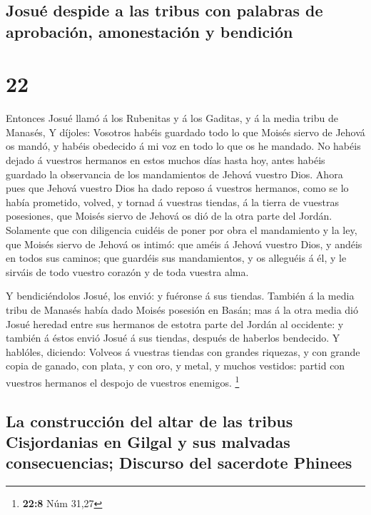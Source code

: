\hypertarget{josuuxe9-despide-a-las-tribus-con-palabras-de-aprobaciuxf3n-amonestaciuxf3n-y-bendiciuxf3n}{%
\subsection{Josué despide a las tribus con palabras de aprobación,
amonestación y
bendición}\label{josuuxe9-despide-a-las-tribus-con-palabras-de-aprobaciuxf3n-amonestaciuxf3n-y-bendiciuxf3n}}

\hypertarget{section-21}{%
\section{22}\label{section-21}}

 Entonces Josué llamó á los Rubenitas y á los Gaditas, y á
la media tribu de Manasés,  Y díjoles: Vosotros habéis
guardado todo lo que Moisés siervo de Jehová os mandó, y habéis
obedecido á mi voz en todo lo que os he mandado.  No habéis
dejado á vuestros hermanos en estos muchos días hasta hoy, antes habéis
guardado la observancia de los mandamientos de Jehová vuestro Dios.
 Ahora pues que Jehová vuestro Dios ha dado reposo á
vuestros hermanos, como se lo había prometido, volved, y tornad á
vuestras tiendas, á la tierra de vuestras posesiones, que Moisés siervo
de Jehová os dió de la otra parte del Jordán.  Solamente que
con diligencia cuidéis de poner por obra el mandamiento y la ley, que
Moisés siervo de Jehová os intimó: que améis á Jehová vuestro Dios, y
andéis en todos sus caminos; que guardéis sus mandamientos, y os
alleguéis á él, y le sirváis de todo vuestro corazón y de toda vuestra
alma.

 Y bendiciéndolos Josué, los envió: y fuéronse á sus
tiendas.  También á la media tribu de Manasés había dado
Moisés posesión en Basán; mas á la otra media dió Josué heredad entre
sus hermanos de estotra parte del Jordán al occidente: y también á éstos
envió Josué á sus tiendas, después de haberlos bendecido.  Y
hablóles, diciendo: Volveos á vuestras tiendas con grandes riquezas, y
con grande copia de ganado, con plata, y con oro, y metal, y muchos
vestidos: partid con vuestros hermanos el despojo de vuestros enemigos.
\footnote{\textbf{22:8} Núm 31,27}

\hypertarget{la-construcciuxf3n-del-altar-de-las-tribus-cisjordanias-en-gilgal-y-sus-malvadas-consecuencias-discurso-del-sacerdote-phinees}{%
\subsection{La construcción del altar de las tribus Cisjordanias en
Gilgal y sus malvadas consecuencias; Discurso del sacerdote
Phinees}\label{la-construcciuxf3n-del-altar-de-las-tribus-cisjordanias-en-gilgal-y-sus-malvadas-consecuencias-discurso-del-sacerdote-phinees}}


